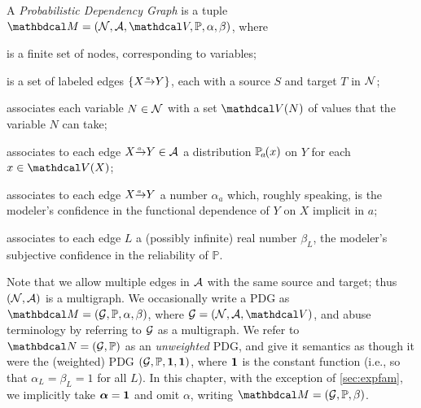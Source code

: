 \begin{defn}
    \label{def:model}
A \emph{Probabilistic Dependency Graph}
is a tuple $\dg M = (\N,\Ar,\V,\mathbb P, \alpha, \beta)$, where 
%
\begin{description}[topsep=0pt]%
	\item[$\N$] \notation{$:\Set$}%
		is a finite set of nodes, corresponding to variables;
	\item[$\Ar$] %
		is a set of labeled edges $\{ \ed aXY \}$, each with a source 
		$S$ and target $T$ in $\N$;
	\item[$\V$] \notation{$: \N \to \Set$}%
		associates each variable $N \in \mathcal N$ with a set $\V(N)$ of values that the variable $N$ can take;
  	\item[$\mathbb P$]
	associates to each edge $\ed aXY \in \Ar$
	a distribution $\p_a(x)$ on $Y$ for each $x \in \V(X)$; 

\item[$\balpha$] 
associates to each edge $\ed aXY$ a number $\alpha_a$ which,
roughly speaking, is the modeler's confidence in the functional
dependence of $Y$ on $X$ implicit in $a$; 
\item[$\bbeta$] 
    \notation{$:\Ar \to \Rext$}
associates to each edge $L$ a (possibly infinite) real number $\beta_L$,
the modeler's 
subjective confidence in the reliability of
$\mathbb P$. 
\end{description}

Note that we allow multiple edges in $\Ar$ with the same source and
target; thus $(\mathcal N,\mathcal A)$ is a multigraph.  We occasionally write a PDG
as $\dg M = (\Gr,\mathbb P, \alpha,\beta)$, where $\Gr = (\N,\Ar,\V)$, 
and abuse terminology by referring to $\mathcal G$ as a multigraph.
We refer to 
${\dg N} = (\Gr, \mathbb P)$ as an \emph{unweighted} PDG,
and give it semantics as though it were the (weighted) PDG $(\mathcal G, \mathbb P, \mathbf 1, \mathbf 1)$, where
$\bf 1$ is the constant function (i.e., so that $\alpha_L = \beta_L = 1$ for all $L$). 
In this chapter, with the exception of \cref{sec:expfam}, we implicitly take $\boldsymbol\alpha = {\bf 1}$
and omit $\alpha$, writing $\dg M = (\Gr, \mathbb P, \beta)$.
\end{defn}

